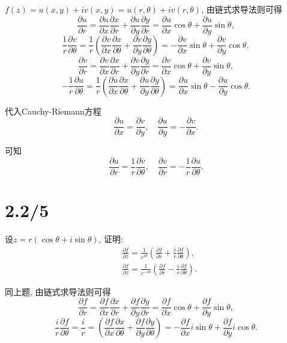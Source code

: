 \documentclass[11pt,a4paper]{article}
\begin{document}
$f(z)=u(x,y)+iv(x,y)=u(r,\theta)+iv(r,\theta)$, 由链式求导法则可得
$$\frac{\partial u}{\partial r}=\frac{\partial u}{\partial x}\frac{\partial x}{\partial r}+\frac{\partial u}{\partial y}\frac{\partial y}{\partial r}=\frac{\partial u}{\partial x}\cos\theta+\frac{\partial u}{\partial y}\sin\theta,$$
$$\frac{1}{r}\frac{\partial v}{\partial\theta}=\frac{1}{r}\left(\frac{\partial v}{\partial x}\frac{\partial x}{\partial\theta}+\frac{\partial v}{\partial y}\frac{\partial y}{\partial\theta}\right)=-\frac{\partial v}{\partial x}\sin\theta+\frac{\partial v}{\partial y}\cos\theta,$$
$$\frac{\partial v}{\partial r}=\frac{\partial v}{\partial x}\frac{\partial x}{\partial r}+\frac{\partial v}{\partial y}\frac{\partial y}{\partial r}=\frac{\partial v}{\partial x}\cos\theta+\frac{\partial v}{\partial y}\sin\theta,$$
$$-\frac{1}{r}\frac{\partial u}{\partial\theta}=\frac{1}{r}\left(\frac{\partial u}{\partial x}\frac{\partial x}{\partial\theta}+\frac{\partial u}{\partial y}\frac{\partial y}{\partial\theta}\right)=\frac{\partial u}{\partial x}\sin\theta-\frac{\partial u}{\partial y}\cos\theta.$$

代入Cauchy-Riemann方程
$$\frac{\partial u}{\partial x}=\frac{\partial v}{\partial y},\quad\frac{\partial u}{\partial y}=-\frac{\partial v}{\partial x}.$$

可知
$$\frac{\partial u}{\partial r}=\frac{1}{r}\frac{\partial v}{\partial\theta},\quad \frac{\partial v}{\partial r}=-\frac{1}{r}\frac{\partial u}{\partial\theta}.$$

\section{2.2/5}
\begin{problem}
  设$z=r(\cos\theta+i\sin\theta)$, 证明:
  \begin{align*}
    &\frac{\partial f}{\partial \bar{z}}=\frac{1}{e^{i\theta}}\left(\frac{\partial f}{\partial r}+\frac{i}{r}\frac{\partial f}{\partial\theta}\right),\\
    &\frac{\partial f}{\partial z}=\frac{1}{e^{-i\theta}}\left(\frac{\partial f}{\partial r}-\frac{i}{r}\frac{\partial f}{\partial\theta}\right).
  \end{align*}
\end{problem}

同上题, 由链式求导法则可得
$$\frac{\partial f}{\partial r}=\frac{\partial f}{\partial x}\frac{\partial x}{\partial r}+\frac{\partial f}{\partial y}\frac{\partial y}{\partial r}=\frac{\partial f}{\partial x}\cos\theta+\frac{\partial f}{\partial y}\sin\theta,$$
$$\frac{i}{r}\frac{\partial f}{\partial\theta}=\frac{i}{r}=\left(\frac{\partial f}{\partial x}\frac{\partial x}{\partial\theta}+\frac{\partial f}{\partial y}\frac{\partial y}{\partial\theta}\right)=-\frac{\partial f}{\partial x}i\sin\theta+\frac{\partial f}{\partial y}i\cos\theta.$$
\end{document}
